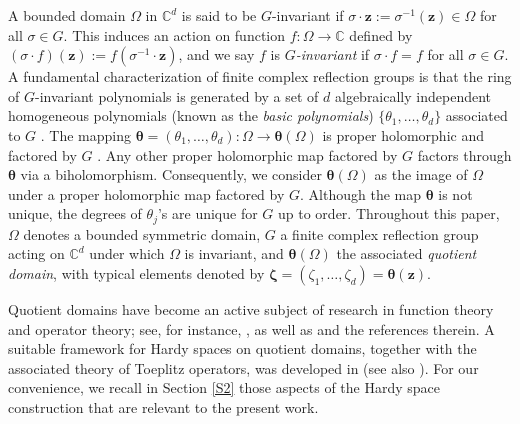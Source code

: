 \documentclass[12pt,reqno]{amsart}
\theoremstyle{remark}
\theoremstyle{definition}
\def \z{\boldsymbol{z}}
\begin{document}
A bounded domain $\Omega$ in $\mathbb C^d$ is said to be $G$-invariant if $\sigma\cdot\z:=\sigma^{-1}(\z)\in \Omega$ for all $\sigma\in G.$ 
This induces an action on function $f:\Omega \to \mathbb C$ defined by  $(\sigma\cdot f)(\z):=f(\sigma^{-1}\cdot \z)$, and we say $f$ is {\it $G$-invariant} if $\sigma \cdot f=f$ for all $\sigma\in G.$ A fundamental characterization of finite complex reflection groups is that the ring of $G$-invariant polynomials is generated by a set of $d$ algebraically independent homogeneous polynomials (known as the {\it basic polynomials}) $\{\theta_1,\ldots, \theta_d\}$ associated to $G$ \cite[p. 282]{ST1954}. The mapping $\boldsymbol \theta=(\theta_1,\ldots, \theta_d): \Omega \to \boldsymbol \theta(\Omega)$ is proper holomorphic and factored by $G$ \cite{RD1982, TM2013}. Any other proper holomorphic map factored by $G$ factors through $\boldsymbol \theta$ via a biholomorphism.
Consequently, we consider $\boldsymbol \theta(\Omega)$ as the image of $\Omega$ under a proper holomorphic map factored by $G.$ 
Although the map $\boldsymbol \theta$ is not unique, the degrees of $\theta_j$'s are unique for $G$ up to order. Throughout this paper, $\Omega$ denotes a bounded symmetric domain, $G$ a finite complex reflection group acting on $\mathbb C^d$ under which $\Omega$ is invariant, and $\boldsymbol \theta(\Omega)$ the associated {\it quotient domain}, with typical elements denoted by $\boldsymbol \zeta=(\zeta_1,\ldots, \zeta_d)=\boldsymbol \theta(\z).$


Quotient domains have become an active subject of research in function theory and operator theory; see, for instance, \cite{BS1982, TM2013, MRZ2013, TirDS2021,  DS2021, BDGR2022,  GN2023, BBS2024}, as well as \cite{GR2024} and the references therein.
A suitable framework for Hardy spaces on quotient domains, together with the associated theory of Toeplitz operators, was developed in \cite{GR2024} (see also \cite{MRZ2013}). 
For our convenience, we recall in Section \ref{S2} those aspects of the Hardy space construction that are relevant to the present work.
\end{document}
